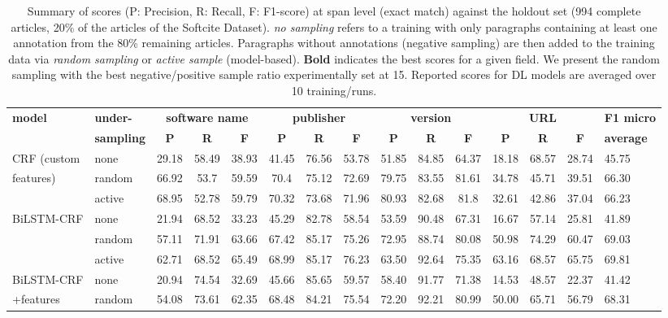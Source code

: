 \documentclass[11pt, a4paper]{article}
\begin{document}
\begin{table}
\caption{Summary of scores (P: Precision, R: Recall, F: F1-score) at span level (exact match) against the holdout set (994 complete articles, 20\% of the articles of the Softcite Dataset). {\sl no sampling} refers to a training with only paragraphs containing at least one annotation from the 80\% remaining articles. Paragraphs without annotations (negative sampling) are then added to the training data via {\sl random sampling} or {\sl active sample} (model-based). {\bf Bold} indicates the best scores for a given field. We present the random sampling with the best negative/positive sample ratio experimentally set at 15. Reported scores for DL models are averaged over 10 training/runs. }
\begin{center}

\begin{tabular}{l | l | c c c | c c c | c c c | c c c | l }
\hline
{\bf model} & {\bf under-} & \multicolumn{3}{c|}{\bf software name} & \multicolumn{3}{c|}{\bf publisher} & \multicolumn{3}{c|}{\bf version}  & \multicolumn{3}{c|}{\bf URL} & {\bf F1 micro} \\
\cline{3-14}
 & {\bf sampling} & {\bf P} & {\bf R} & {\bf F} & {\bf P} & {\bf R} & {\bf F} & {\bf P} & {\bf R} & {\bf F} & {\bf P} & {\bf R} & {\bf F} & {\bf  average} \\
\hline
CRF (custom & none  & 29.18 & 58.49 & 38.93 & 41.45 & 76.56 & 53.78 & 51.85 & 84.85 & 64.37 & 18.18 & 68.57 & 28.74 & 45.75 \\ 
features) & random & 66.92 & 53.7 & 59.59 & 70.4 & 75.12 & 72.69 & 79.75 & 83.55 & 81.61 & 34.78 & 45.71 & 39.51 & 66.30 \\
 & active & 68.95 & 52.78 & 59.79 & 70.32 & 73.68 & 71.96 & 80.93 & 82.68 & 81.8 & 32.61 & 42.86 & 37.04 & 66.23 \\ 
\hline
BiLSTM-CRF & none & 21.94 & 68.52 & 33.23 & 45.29 & 82.78 & 58.54 & 53.59 & 90.48 & 67.31 & 16.67 & 57.14 & 25.81 & 41.89 \\ 
 & random & 57.11 & 71.91 & 63.66 & 67.42 & 85.17 & 75.26 & 72.95 & 88.74 & 80.08 & 50.98 & 74.29 & 60.47 & 69.03 \\ 
 & active & 62.71 & 68.52 & 65.49 & 68.99 & 85.17 & 76.23 & 63.50 & 92.64 & 75.35 & 63.16 & 68.57 & 65.75 & 69.81 \\ 
\hline
BiLSTM-CRF & none & 20.94 & 74.54 & 32.69 & 45.66 & 85.65 & 59.57 & 58.40 & 91.77 & 71.38 & 14.53 & 48.57 & 22.37 & 41.42 \\  
+features & random & 54.08 & 73.61 & 62.35 & 68.48 & 84.21 & 75.54 & 72.20 & 92.21 & 80.99 & 50.00 & 65.71 & 56.79 & 68.31 \\ 

\end{tabular}
\end{center}
\end{table}
\end{document}
